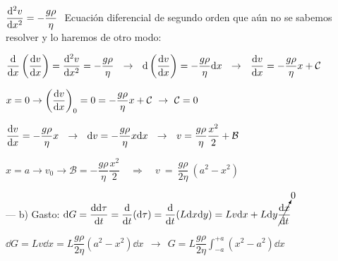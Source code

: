 $\displaystyle \dv[2]{v}{x}=-\dfrac{g\rho}{\eta}\ $  Ecuación diferencial de segundo orden que aún no se sabemos resolver y lo haremos de otro modo:

$\displaystyle \dv{x} \left( \dv{v}{x} \right) =\dv[2]{v}{x}=-\dfrac{g\rho}{\eta} \ \ \to \ \  \dd  \left( \dv{v}{x} \right) = -\dfrac{g\rho}{\eta} \dd x \ \ \to \ \  \dv{v}{x}=-\dfrac{g\rho}{\eta} x + \mathcal C$

$\displaystyle x=0 \to \left( \dv{v}{x} \right)_0=0 = -\dfrac{g\rho}{\eta} x + \mathcal C \ \to \  \mathcal C=0$

$\displaystyle \dv{v}{x}=-\dfrac{g\rho}{\eta} x \ \ \to \ \ \dd v = -\dfrac{g\rho}{\eta} x \dd x \ \ \to \ \ v=\dfrac{g \rho }{\eta}\dfrac{x^2}{2} +\mathcal B$

$x=a \to v_0 \to \mathcal B=-\dfrac{g \rho }{\eta}\dfrac{x^2}{2} \quad \Rightarrow \quad v\ =\ \dfrac{g\rho}{2\eta} \ (a^2-x^2)$

--- b) Gasto:  $\dd G=\displaystyle \dv{\dd \tau}{t}=\dv{t} (\dd \tau) = \dv{t} (L\dd x \dd y)=Lv\dd x + L \dd y \cancelto{0}{\dv{x}{t}}$

$\displaystyle \dd G= L v \dd x =L \dfrac{g\rho}{2\eta} (a^2-x^2) \dd x\ \ \to \ \ G=L \dfrac{g\rho}{2\eta} \int_{-a}^{+a} (x^2-a^2) \dd x$

